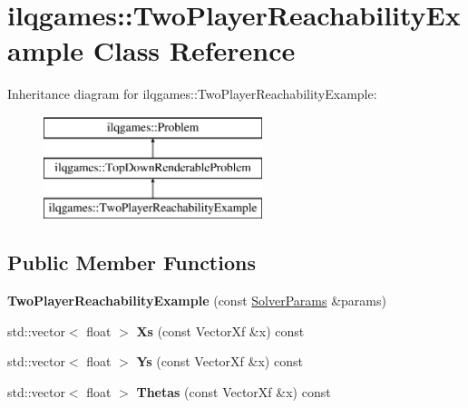 \hypertarget{classilqgames_1_1_two_player_reachability_example}{}\section{ilqgames\+:\+:Two\+Player\+Reachability\+Example Class Reference}
\label{classilqgames_1_1_two_player_reachability_example}
Inheritance diagram for ilqgames\+:\+:Two\+Player\+Reachability\+Example\+:\begin{figure}[H]
\begin{center}
\leavevmode
\includegraphics[height=3.000000cm]{classilqgames_1_1_two_player_reachability_example}
\end{center}
\end{figure}
\subsection*{Public Member Functions}
\begin{DoxyCompactItemize}
\item 
{\bfseries Two\+Player\+Reachability\+Example} (const \hyperlink{structilqgames_1_1_solver_params}{Solver\+Params} \&params)\hypertarget{classilqgames_1_1_two_player_reachability_example_a1f7770c0924bbbc29f2cedd64442c82b}{}\label{classilqgames_1_1_two_player_reachability_example_a1f7770c0924bbbc29f2cedd64442c82b}

\item 
std\+::vector$<$ float $>$ {\bfseries Xs} (const Vector\+Xf \&x) const \hypertarget{classilqgames_1_1_two_player_reachability_example_af93128ff81cbed5e206b05d8355c5d89}{}\label{classilqgames_1_1_two_player_reachability_example_af93128ff81cbed5e206b05d8355c5d89}

\item 
std\+::vector$<$ float $>$ {\bfseries Ys} (const Vector\+Xf \&x) const \hypertarget{classilqgames_1_1_two_player_reachability_example_a1c612a99ff8af7ff30d5f8bdf70fcf6a}{}\label{classilqgames_1_1_two_player_reachability_example_a1c612a99ff8af7ff30d5f8bdf70fcf6a}

\item 
std\+::vector$<$ float $>$ {\bfseries Thetas} (const Vector\+Xf \&x) const \hypertarget{classilqgames_1_1_two_player_reachability_example_a8b9a5632f3a3252796824d510b23530a}{}\label{classilqgames_1_1_two_player_reachability_example_a8b9a5632f3a3252796824d510b23530a}

\end{DoxyCompactItemize}

